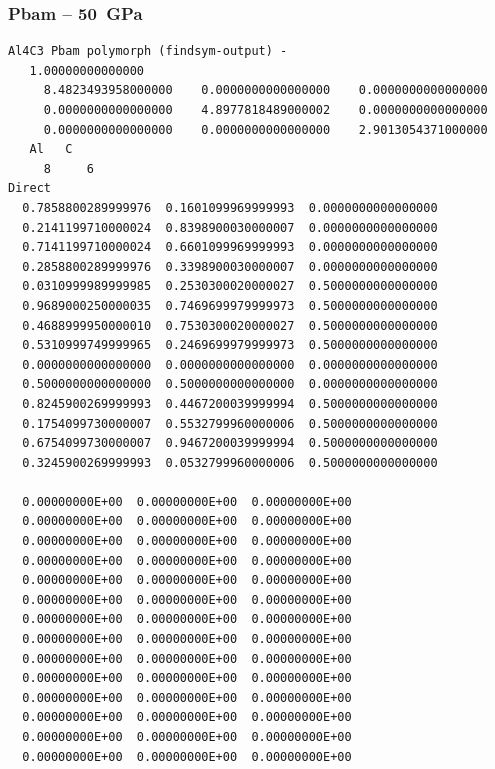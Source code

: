 \subsubsection*{Pbam -- 50~GPa}
\begin{footnotesize}
\begin{verbatim}
Al4C3 Pbam polymorph (findsym-output) - 
   1.00000000000000     
     8.4823493958000000    0.0000000000000000    0.0000000000000000
     0.0000000000000000    4.8977818489000002    0.0000000000000000
     0.0000000000000000    0.0000000000000000    2.9013054371000000
   Al   C 
     8     6
Direct
  0.7858800289999976  0.1601099969999993  0.0000000000000000
  0.2141199710000024  0.8398900030000007  0.0000000000000000
  0.7141199710000024  0.6601099969999993  0.0000000000000000
  0.2858800289999976  0.3398900030000007  0.0000000000000000
  0.0310999989999985  0.2530300020000027  0.5000000000000000
  0.9689000250000035  0.7469699979999973  0.5000000000000000
  0.4688999950000010  0.7530300020000027  0.5000000000000000
  0.5310999749999965  0.2469699979999973  0.5000000000000000
  0.0000000000000000  0.0000000000000000  0.0000000000000000
  0.5000000000000000  0.5000000000000000  0.0000000000000000
  0.8245900269999993  0.4467200039999994  0.5000000000000000
  0.1754099730000007  0.5532799960000006  0.5000000000000000
  0.6754099730000007  0.9467200039999994  0.5000000000000000
  0.3245900269999993  0.0532799960000006  0.5000000000000000
 
  0.00000000E+00  0.00000000E+00  0.00000000E+00
  0.00000000E+00  0.00000000E+00  0.00000000E+00
  0.00000000E+00  0.00000000E+00  0.00000000E+00
  0.00000000E+00  0.00000000E+00  0.00000000E+00
  0.00000000E+00  0.00000000E+00  0.00000000E+00
  0.00000000E+00  0.00000000E+00  0.00000000E+00
  0.00000000E+00  0.00000000E+00  0.00000000E+00
  0.00000000E+00  0.00000000E+00  0.00000000E+00
  0.00000000E+00  0.00000000E+00  0.00000000E+00
  0.00000000E+00  0.00000000E+00  0.00000000E+00
  0.00000000E+00  0.00000000E+00  0.00000000E+00
  0.00000000E+00  0.00000000E+00  0.00000000E+00
  0.00000000E+00  0.00000000E+00  0.00000000E+00
  0.00000000E+00  0.00000000E+00  0.00000000E+00
\end{verbatim}
\end{footnotesize}

